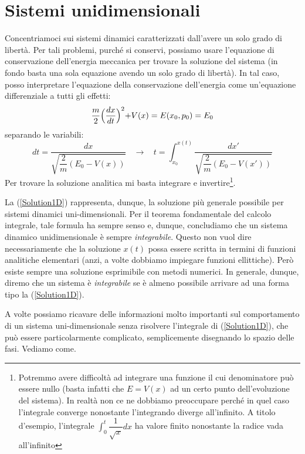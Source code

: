 \documentclass[a4paper,openany]{article}
\begin{document}
	\section{Sistemi unidimensionali}
	Concentriamoci sui sistemi dinamici caratterizzati dall'avere un solo grado di libertà. Per tali problemi, purché si conservi, possiamo usare l'equazione di conservazione dell'energia meccanica per trovare la soluzione del sistema (in fondo basta una sola equazione avendo un solo grado di libertà). In tal caso, posso interpretare l'equazione della conservazione dell'energia come un'equazione differenziale a tutti gli effetti:
	\begin{equation}
		\dfrac{m}{2}\Bigl(\dfrac{dx}{dt}\Bigl)^{2} + V(x) = E(x_{0},p_{0}) = E_{0}
	\end{equation}
	separando le variabili:
	\begin{equation}
		dt = \dfrac{dx}{\sqrt{\dfrac{2}{m}(E_{0}-V(x))}}
		\>\>\>\> \longrightarrow \>\>\>\>
		t = \int_{x_{0}}^{x(t)}\dfrac{dx'}{\sqrt{\dfrac{2}{m}(E_{0}-V(x'))}}
		\label{Solution1D}
	\end{equation}
	Per trovare la soluzione analitica mi basta integrare e invertire\footnote{Potremmo avere difficoltà ad integrare una funzione il cui denominatore può essere nullo (basta infatti che $E = V(x)$ ad un certo punto dell'evoluzione del sistema). In realtà non ce ne dobbiamo preoccupare perché in quel caso l'integrale converge nonostante l'integrando diverge all'infinito. A titolo d'esempio, l'integrale $\int_{0}^{t}\dfrac{1}{\sqrt{x}}dx$ ha valore finito nonostante la radice vada all'infinito}.
	
	La (\ref{Solution1D}) rappresenta, dunque, la soluzione più generale possibile per sistemi dinamici uni-dimensionali. Per il teorema fondamentale del calcolo integrale, tale formula ha sempre senso e, dunque, concludiamo che un sistema dinamico unidimensionale è sempre \textit{integrabile}. Questo non vuol dire necessariamente che la soluzione $x(t)$ possa essere scritta in termini di funzioni analitiche elementari (anzi, a volte dobbiamo impiegare funzioni ellittiche). Però esiste sempre una soluzione esprimibile con metodi numerici. In generale, dunque, diremo che un sistema è \textit{integrabile} se è almeno possibile arrivare ad una forma tipo la (\ref{Solution1D}). 
	
	
	
	A volte possiamo ricavare delle informazioni molto importanti sul comportamento di un sistema uni-dimensionale senza risolvere l'integrale di (\ref{Solution1D}), che può essere particolarmente complicato, semplicemente disegnando lo spazio delle fasi. Vediamo come.
\end{document}
